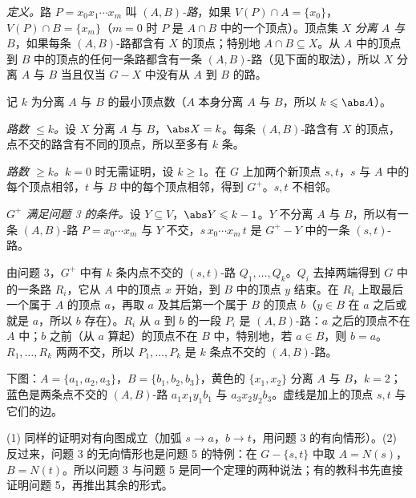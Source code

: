\begin{solution}
\emph{定义。}路 $P=x_0x_1\cdots x_m$ 叫 \emph{$(A,B)$-路}，如果 $V(P)\cap A=\{x_0\}$，$V(P)\cap B=\{x_m\}$（$m=0$ 时 $P$ 是 $A\cap B$ 中的一个顶点）。顶点集 $X$ \emph{分离 $A$ 与 $B$}，如果每条 $(A,B)$-路都含有 $X$ 的顶点；特别地 $A\cap B\subseteq X$。从 $A$ 中的顶点到 $B$ 中的顶点的任何一条路都含有一条 $(A,B)$-路（见下面的取法），所以 $X$ 分离 $A$ 与 $B$ 当且仅当 $G-X$ 中没有从 $A$ 到 $B$ 的路。

记 $k$ 为分离 $A$ 与 $B$ 的最小顶点数（$A$ 本身分离 $A$ 与 $B$，所以 $k\leqslant\abs A$）。

\emph{路数 $\leqslant k$。}设 $X$ 分离 $A$ 与 $B$，$\abs X=k$。每条 $(A,B)$-路含有 $X$ 的顶点，点不交的路含有不同的顶点，所以至多有 $k$ 条。

\emph{路数 $\geqslant k$。}$k=0$ 时无需证明，设 $k\geqslant1$。在 $G$ 上加两个新顶点 $s,t$，$s$ 与 $A$ 中的每个顶点相邻，$t$ 与 $B$ 中的每个顶点相邻，得到 $G^+$。$s,t$ 不相邻。

\emph{$G^+$ 满足问题 3 的条件。}设 $Y\subseteq V$，$\abs Y\leqslant k-1$。$Y$ 不分离 $A$ 与 $B$，所以有一条 $(A,B)$-路 $P=x_0\cdots x_m$ 与 $Y$ 不交，$s\,x_0\cdots x_m\,t$ 是 $G^+-Y$ 中的一条 $(s,t)$-路。

由问题 3，$G^+$ 中有 $k$ 条内点不交的 $(s,t)$-路 $Q_1,\dots,Q_k$。$Q_i$ 去掉两端得到 $G$ 中的一条路 $R_i$，它从 $A$ 中的顶点 $x$ 开始，到 $B$ 中的顶点 $y$ 结束。在 $R_i$ 上取最后一个属于 $A$ 的顶点 $a$，再取 $a$ 及其后第一个属于 $B$ 的顶点 $b$（$y\in B$ 在 $a$ 之后或就是 $a$，所以 $b$ 存在）。$R_i$ 从 $a$ 到 $b$ 的一段 $P_i$ 是 $(A,B)$-路：$a$ 之后的顶点不在 $A$ 中；$b$ 之前（从 $a$ 算起）的顶点不在 $B$ 中，特别地，若 $a\in B$，则 $b=a$。$R_1,\dots,R_k$ 两两不交，所以 $P_1,\dots,P_k$ 是 $k$ 条点不交的 $(A,B)$-路。

下图：$A=\{a_1,a_2,a_3\}$，$B=\{b_1,b_2,b_3\}$，黄色的 $\{x_1,x_2\}$ 分离 $A$ 与 $B$，$k=2$；蓝色是两条点不交的 $(A,B)$-路 $a_1x_1y_1b_1$ 与 $a_3x_2y_2b_3$。虚线是加上的顶点 $s,t$ 与它们的边。
\begin{center}
\end{center}
\end{solution}
\begin{remark}
(1) 同样的证明对有向图成立（加弧 $s\to a$，$b\to t$，用问题 3 的有向情形）。(2) 反过来，问题 3 的无向情形也是问题 5 的特例：在 $G-\{s,t\}$ 中取 $A=N(s)$，$B=N(t)$。所以问题 3 与问题 5 是同一个定理的两种说法；有的教科书先直接证明问题 5，再推出其余的形式。
\end{remark}
